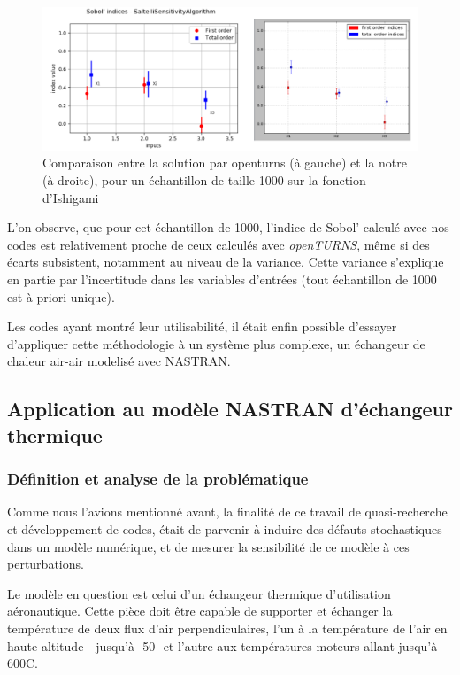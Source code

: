 \documentclass[a4paper,10pt]{article}
\begin{document}
\begin{figure}[H]
   \centering   
   \includegraphics[scale=0.255]{comparisonOtMe.png}
      \caption{Comparaison entre la solution par openturns (à gauche) et la notre (à droite), pour un échantillon de taille 1000 sur la fonction d'Ishigami}
         \label{Comparison}
\end{figure}

L'on observe, que pour cet échantillon de 1000, l'indice de Sobol' calculé avec nos codes est relativement proche de ceux calculés avec \textit{openTURNS}, même si des écarts subsistent, notamment au niveau de la variance. Cette variance s'explique en partie par l'incertitude dans les variables d'entrées (tout échantillon de 1000 est à priori unique).

Les codes ayant montré leur utilisabilité, il était enfin possible d'essayer d'appliquer cette méthodologie à un système plus complexe, un échangeur de chaleur air-air modelisé avec NASTRAN. 
 
\subsection{Application au modèle NASTRAN d'échangeur thermique}
\subsubsection{Définition et analyse de la problématique}

Comme nous l'avions mentionné avant, la finalité de ce travail de quasi-recherche et développement de codes, était de parvenir à induire des défauts stochastiques dans un modèle numérique, et de mesurer la sensibilité de ce modèle à ces perturbations. 

Le modèle en question est celui d'un échangeur thermique d'utilisation aéronautique. Cette pièce doit être  capable de supporter et échanger la température de deux flux d'air perpendiculaires, l'un à la température de l'air en haute altitude - jusqu'à -50\degree - et l'autre aux températures moteurs allant jusqu'à 600C. \\
\end{document}
